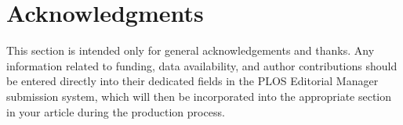 ﻿\section*{Acknowledgments}

This section is intended only for general acknowledgements and thanks. Any
information related to funding, data availability, and author contributions
should be entered directly into their dedicated fields in the PLOS Editorial
Manager submission system, which will then be incorporated into the appropriate
section in your article during the production process.
